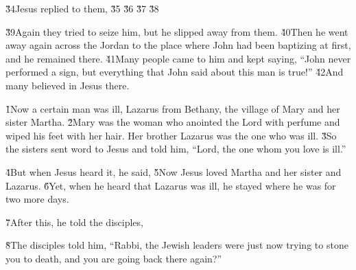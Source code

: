 \v{34}Jesus replied to them,   \v{35} \v{36} \v{37} \v{38} 

\v{39}Again they tried to seize him, but he slipped away from them. \v{40}Then he went away again across the Jordan to the place where John had been baptizing at first, and he remained there. \v{41}Many people came to him and kept saying, ``John never performed a sign, but everything that John said about this man is true!'' \v{42}And many believed in Jesus there.

\v{1}Now a certain man was ill, Lazarus from Bethany, the village of Mary and her sister Martha. \v{2}Mary was the woman who anointed the Lord with perfume and wiped his feet with her hair. Her brother Lazarus was the one who was ill. \v{3}So the sisters sent word to Jesus and told him, ``Lord, the one whom you love is ill.''

\v{4}But when Jesus heard it, he said,  \v{5}Now Jesus loved Martha and her sister and Lazarus. \v{6}Yet, when he heard that Lazarus was ill, he stayed where he was for two more days.

\v{7}After this, he told the disciples, 

\v{8}The disciples told him, ``Rabbi, the Jewish leaders were just now trying to stone you to death, and you are going back there again?''

